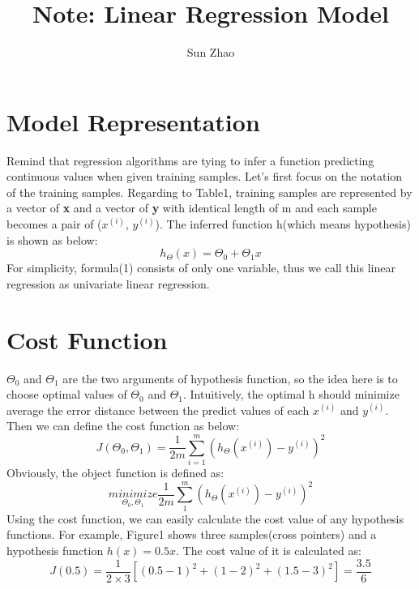 \documentclass{article}
\title{Note: Linear Regression Model}
\author{Sun Zhao}
\begin{document}
\maketitle
\newpage

\section{Model Representation}
Remind that regression algorithms are tying to infer a function predicting continuous values when given training samples. Let's first focus on the notation of the training samples. Regarding to Table1, training samples are represented by a vector of \textbf{x} and a vector of \textbf{y} with identical length of m and each sample becomes a pair of ($x^{(i)}$, $y^{(i)}$). The inferred function h(which means hypothesis) is shown as below:\\

\begin{equation}\label{hypothesis_function}
  h_\Theta(x)=\Theta_0 + \Theta_1x
\end{equation}
For simplicity, formula(1) consists of only one variable, thus we call this linear regression as univariate linear regression.

\section{Cost Function}
$\Theta_0$ and $\Theta_1$ are the two arguments of hypothesis function, so the idea here is to choose optimal values of $\Theta_0$ and $\Theta_1$. Intuitively, the optimal h should minimize average the error distance between the predict values of each $x^(i)$ and $y^(i)$. Then we can define the cost function as below:
\begin{equation}\label{cost_function}
J(\Theta_0, \Theta_1) = \frac{1}{2m} \sum_{i=1}^{m} (h_\Theta({x^{(i)}})-y^{(i)})^2
\end{equation}
Obviously, the object function is defined as:
\begin{equation}\label{object_function}
\underset{\Theta_0, \Theta_1}{minimize} \frac{1}{2m} \sum_{1}^{m} (h_\Theta({x^{(i)}})-y^{(i)})^2
\end{equation}
Using the cost function, we can easily calculate the cost value of any hypothesis functions. For example, Figure1 shows three samples(cross pointers) and a hypothesis function $h(x)=0.5x$. The cost value of it is calculated as:
\begin{equation}\label{cost_function_example}
J(0.5)=\frac{1}{2 \times 3}[(0.5-1)^2 + (1-2)^2 + (1.5-3)^2]=\frac {3.5}{6}
\end{equation}
\end{document}
